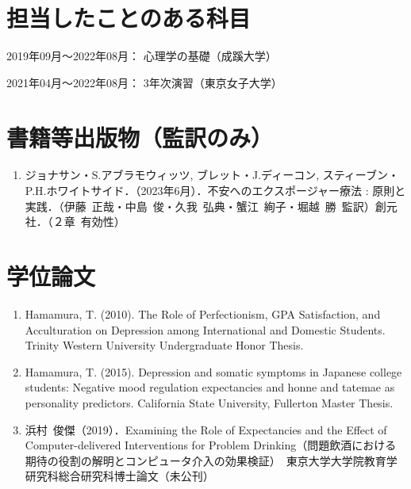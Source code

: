 \documentclass[11pt,a4paper]{article}
\begin{document}
\section{担当したことのある科目}
\begin{description}
	\item 2019年09月～2022年08月： 心理学の基礎（成蹊大学）
	\item 2021年04月〜2022年08月： 3年次演習（東京女子大学）
\end{description}

\section{書籍等出版物（監訳のみ）}
	\begin{enumerate}
		\item ジョナサン・S.アブラモウィッツ, ブレット・J.ディーコン, スティーブン・P.H.ホワイトサイド．（2023年6月）．不安へのエクスポージャー療法 : 原則と実践．（伊藤\ 正哉・中島\ 俊・久我\ 弘典・蟹江\ 絢子・堀越\ 勝\ 監訳）創元社．（２章\ 有効性）
	\end{enumerate}

\section{学位論文}
	\begin{enumerate}
		\item Hamamura, T.  (2010). The Role of Perfectionism, GPA Satisfaction, and Acculturation on Depression among International and Domestic Students. Trinity Western University Undergraduate Honor Thesis.
		\item Hamamura, T. (2015). Depression and somatic symptoms in Japanese college students: Negative mood regulation expectancies and honne and tatemae as personality predictors. California State University, Fullerton Master Thesis.
		\item 浜村\ 俊傑（2019）．Examining the Role of Expectancies and the Effect of Computer-delivered Interventions for Problem Drinking（問題飲酒における期待の役割の解明とコンピュータ介入の効果検証）　東京大学大学院教育学研究科総合研究科博士論文（未公刊）
	\end{enumerate}
\end{document}
